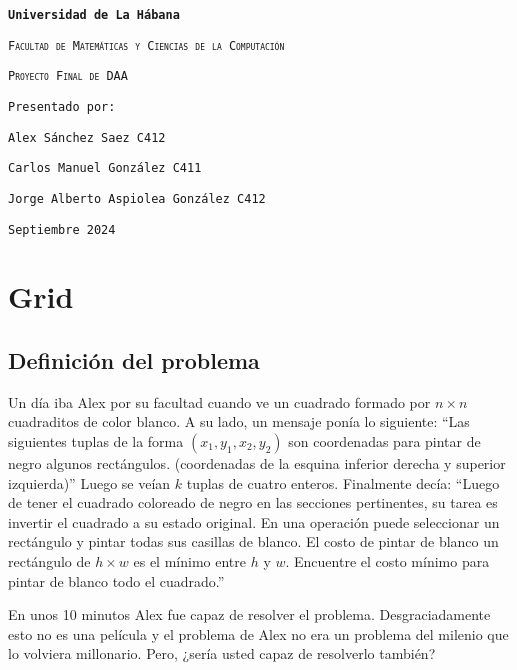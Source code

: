 \documentclass{article}
\begin{document}
    \sloppypar
    \begin{titlepage}
        \centering
        {\bfseries\LARGE\texttt{Universidad de La Hábana} \par}
        \vspace{1cm}
        {\scshape\Large\texttt{Facultad de Matemáticas y Ciencias de la Computación} \par}
        \vfill
        {\scshape\Huge\texttt{Proyecto Final de DAA } \par}
        \vspace{1cm}
        {\scshape\LARGE\texttt{} \par}
        \vfill
        {\LARGE\texttt{Presentado por:} \par}
        \vspace{0.5cm}
        {\Large\texttt{Alex Sánchez Saez C412} \par}
        {\Large\texttt{Carlos Manuel González C411} \par}
        {\Large\texttt{Jorge Alberto Aspiolea González C412} \par}
        \vfill
        {\Large\texttt{Septiembre 2024} \par}
    \end{titlepage}
	\tableofcontents
	\newpage
	\section{Grid}
	\subsection{Definición del problema}
	Un día iba Alex por su facultad cuando ve un cuadrado formado por $n \times n$  
cuadraditos de color blanco. A su lado, un mensaje ponía lo siguiente: ``Las  
siguientes tuplas de la forma $(x_1, y_1, x_2, y_2)$ son coordenadas para pintar de  
negro algunos rectángulos. (coordenadas de la esquina inferior derecha y superior  
izquierda)'' Luego se veían $k$ tuplas de cuatro enteros. Finalmente decía:  
``Luego de tener el cuadrado coloreado de negro en las secciones pertinentes, su  
tarea es invertir el cuadrado a su estado original. En una operación puede seleccionar  
un rectángulo y pintar todas sus casillas de blanco. El costo de pintar  
de blanco un rectángulo de $h \times w$ es el mínimo entre $h$ y $w$. Encuentre el costo  
mínimo para pintar de blanco todo el cuadrado.''

En unos 10 minutos Alex fue capaz de resolver el problema. Desgraciadamente  
esto no es una película y el problema de Alex no era un problema  
del milenio que lo volviera millonario. Pero, ¿sería usted capaz de resolverlo  
también?
	
\end{document}
